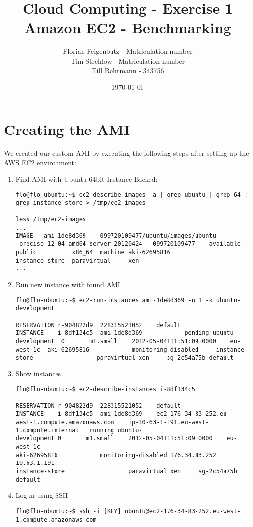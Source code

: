 \documentclass{article}
\title{Cloud Computing - Exercise 1\\
Amazon EC2 - Benchmarking}
\author{Florian Feigenbutz - Matriculation number\\
Tim Strehlow - Matriculation number\\
Till Rohrmann - 343756}
\date{\today}
\begin{document}


\maketitle

\setcounter{section}{1}
\section{Creating the AMI}
We created our custom AMI by executing the following steps after setting up the AWS EC2 environment:
\begin{enumerate}
	\item Find AMI with Ubuntu 64bit Instance-Backed:
\begin{verbatim}
flo@flo-ubuntu:~$ ec2-describe-images -a | grep ubuntu | grep 64 | 
grep instance-store > /tmp/ec2-images

less /tmp/ec2-images
....
IMAGE   ami-1de8d369    099720109477/ubuntu/images/ubuntu
-precise-12.04-amd64-server-20120424   099720109477    available       
public          x86_64  machine aki-62695816                    
instance-store  paravirtual     xen
...
\end{verbatim}
	\item Run new instance with found AMI
\begin{verbatim}
flo@flo-ubuntu:~$ ec2-run-instances ami-1de8d369 -n 1 -k ubuntu-development

RESERVATION	r-904822d9	228315521052	default
INSTANCE	i-8df134c5	ami-1de8d369			pending	ubuntu-development	0		m1.small	2012-05-04T11:51:09+0000	eu-west-1c	aki-62695816			monitoring-disabled		instance-store					paravirtual	xen		sg-2c54a75b	default
\end{verbatim}

	\item Show instances
\begin{verbatim}
flo@flo-ubuntu:~$ ec2-describe-instances i-8df134c5

RESERVATION	r-904822d9	228315521052	default
INSTANCE	i-8df134c5	ami-1de8d369	ec2-176-34-83-252.eu-
west-1.compute.amazonaws.com	ip-10-63-1-191.eu-west-1.compute.internal	running	ubuntu-
development	0		m1.small	2012-05-04T11:51:09+0000	eu-west-1c	
aki-62695816			monitoring-disabled	176.34.83.252	10.63.1.191		
instance-store					paravirtual	xen		sg-2c54a75b	
default
\end{verbatim}

	\item Log in using SSH
\begin{verbatim}
flo@flo-ubuntu:~$ ssh -i [KEY] ubuntu@ec2-176-34-83-252.eu-west-
1.compute.amazonaws.com
\end{verbatim}


\end{enumerate}
\end{document}
